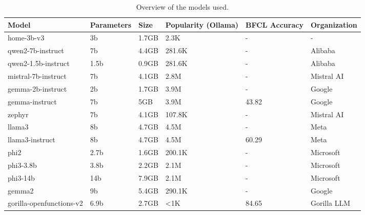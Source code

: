 \begin{table}[h!]
    \centering
    \begin{tabularx}{\textwidth}{lXXp{3cm}Xl}
    \toprule
    Model & Parameters & Size & Popularity \newline (Ollama) & BFCL \newline Accuracy & Organization \\
    \midrule
    home-3b-v3 & 3b & 1.7GB & 2.3K & - & - \\
    qwen2-7b-instruct & 7b & 4.4GB & 281.6K & - & Alibaba \\
    qwen2-1.5b-instruct & 1.5b & 0.9GB & 281.6K & - & Alibaba \\
    mistral-7b-instruct & 7b & 4.1GB & 2.8M & - & Mistral AI \\
    gemma-2b-instruct & 2b & 1.7GB & 3.9M & - & Google \\
    gemma-instruct & 7b & 5GB & 3.9M & 43.82 & Google \\
    zephyr & 7b & 4.1GB & 107.8K & - & Mistral AI \\
    llama3 & 8b & 4.7GB & 4.5M & - & Meta \\
    llama3-instruct & 8b & 4.7GB & 4.5M & 60.29 & Meta \\
    phi2 & 2.7b & 1.6GB & 200.1K & - & Microsoft \\
    phi3-3.8b & 3.8b & 2.2GB & 2.1M & - & Microsoft \\
    phi3-14b & 14b & 7.9GB & 2.1M & - & Microsoft \\
    gemma2 & 9b & 5.4GB & 290.1K & - & Google \\
    gorilla-openfunctions-v2 & 6.9b & 2.7GB & <1K & 84.65 & Gorilla LLM \\
    \bottomrule
    \end{tabularx}
    \caption{Overview of the models used.}
\end{table}

